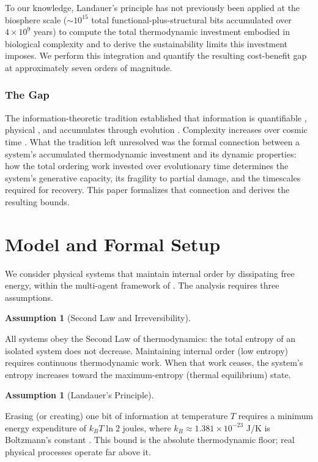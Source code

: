 \documentclass[11pt]{article}
\theoremstyle{plain}
\theoremstyle{definition}
\newtheorem{assumption}[definition]{Assumption}
\theoremstyle{remark}
\let\origsection\section
\renewcommand{\section}{\needspace{12\baselineskip}\origsection}
\let\origsubsubsection\subsubsection
\renewcommand{\subsubsection}{\needspace{4\baselineskip}\origsubsubsection}
\begin{document}
To our knowledge, Landauer's principle has not previously been applied
at the biosphere scale (\(\sim 10^{15}\) total
functional-plus-structural bits accumulated over \(4 \times 10^9\)
years) to compute the total thermodynamic investment embodied in
biological complexity and to derive the sustainability limits this
investment imposes. We perform this integration and quantify the
resulting cost-benefit gap at approximately seven orders of magnitude.

\subsubsection{The Gap}\label{the-gap}

The information-theoretic tradition established that information is
quantifiable \citep{Shannon1948}, physical
\citep{Brillouin1962, Landauer1961}, and accumulates through evolution
\citep{Adami2004}. Complexity increases over cosmic time
\citep{Chaisson2011}. What the tradition left unresolved was the formal
connection between a system's accumulated thermodynamic investment and
its dynamic properties: how the total ordering work invested over
evolutionary time determines the system's generative capacity, its
fragility to partial damage, and the timescales required for recovery.
This paper formalizes that connection and derives the resulting bounds.

\section{Model and Formal Setup}\label{model-and-formal-setup}

We consider physical systems that maintain internal order by dissipating
free energy, within the multi-agent framework of \citep{TC-I}. The
analysis requires three assumptions.

\begin{assumption}[Second Law and Irreversibility]
\label{asm-second-law}

All systems obey the Second Law of thermodynamics: the total entropy of an isolated system does not decrease. Maintaining internal order (low entropy) requires continuous thermodynamic work. When that work ceases, the system's entropy increases toward the maximum-entropy (thermal equilibrium) state.
\end{assumption}

\begin{assumption}[Landauer's Principle]
\label{asm-landauer-principle}

Erasing (or creating) one bit of information at temperature $T$ requires a minimum energy expenditure of $k_B T \ln 2$ joules, where $k_B \approx 1.381 \times 10^{-23}$ J/K is Boltzmann's constant \citep{Landauer1961}. This bound is the absolute thermodynamic floor; real physical processes operate far above it.
\end{assumption}
\end{document}
